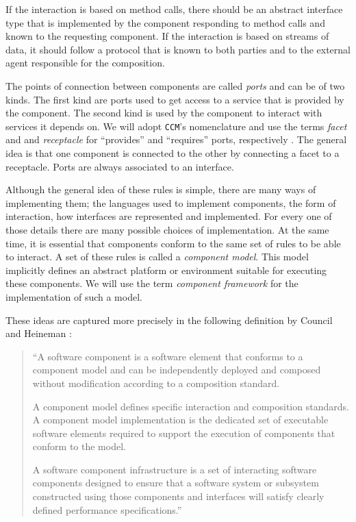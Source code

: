 If the interaction is based on method calls, there should be an abstract interface type that is implemented by the component responding
to method calls and known to the requesting component. If the interaction is based on streams of data, it should follow a protocol
that is known to both parties and to the external agent responsible for the composition.

The points of connection between components are called \emph{ports} and can be of two kinds. The first kind are ports used to
get access to a service that is provided by the component. The second kind is used by the component to interact with services
it depends on. We will adopt \texttt{CCM}'s nomenclature and use the terms \emph{facet} and and \emph{receptacle} for
``provides'' and ``requires'' ports, respectively \cite{CCM}. The general idea is that one component is connected to the other
by connecting a facet to a receptacle. Ports are always associated to an interface.

Although the general idea of these rules is simple, there are many ways of implementing them; the languages used to implement
components, the form of interaction, how interfaces are represented and implemented. For every one of those details there
are many possible choices of implementation. At the same time, it is essential that components conform to the same set of
rules to be able to interact. A set of these rules is called a \emph{component model}. This model implicitly defines an abstract
platform or environment suitable for executing these components. We will use the term \emph{component framework} for the
implementation of such a model.

These ideas are captured more precisely in the following definition by Council and Heineman \cite{Heineman}:

\begin{quotation}
``A software component is a software element that conforms to a component model and can be independently deployed and composed
without modification according to a composition standard.

A component model defines specific interaction and composition standards. A component model implementation is the dedicated
set of executable software elements required to support the execution of components that conform to the model.

A software component infrastructure is a set of interacting software components designed to ensure that a software system
or subsystem constructed using those components and interfaces will satisfy clearly defined performance specifications.''
\end{quotation}

